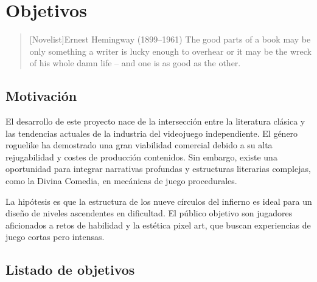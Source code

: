 \chapter{Objetivos}

\begin{quotation}[Novelist]{Ernest Hemingway (1899--1961)}
The good parts of a book may be only something a writer is lucky enough to overhear or it may be the wreck of his whole damn life -- and one is as good as the other.
\end{quotation}

\begin{abstract}
Este capítulo detalla los motivos que impulsan el desarrollo de Via Inferni, analizando la oportunidad de mercado en el género roguelike y el público al que va dirigido. Asimismo, se definen de forma precisa los objetivos técnicos y funcionales que guiarán la construcción del videojuego bajo una metodología de Ingeniería del Software.\end{abstract}

\section{Motivación}
El desarrollo de este proyecto nace de la intersección entre la literatura clásica y las tendencias actuales de la industria del videojuego independiente. El género roguelike ha demostrado una gran viabilidad comercial debido a su alta rejugabilidad y costes de producción contenidos. Sin embargo, existe una oportunidad para integrar narrativas profundas y estructuras literarias complejas, como la Divina Comedia, en mecánicas de juego procedurales.

La hipótesis es que la estructura de los nueve círculos del infierno es ideal para un diseño de niveles ascendentes en dificultad. El público objetivo son jugadores aficionados a retos de habilidad y la estética pixel art, que buscan experiencias de juego cortas pero intensas.

\section{Listado de objetivos}

